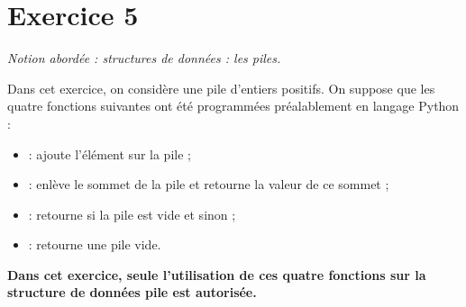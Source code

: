 \documentclass[11pt,a4paper,french,twoside]{PMCours}
\begin{document}
\newpage
\section*{Exercice 5}
\emph{Notion abordée : structures de données : les piles.}

\medskip
Dans cet exercice, on considère une pile d'entiers positifs. On suppose que les quatre
fonctions suivantes ont été programmées préalablement en langage Python :
\begin{itemize}
\item[]  : ajoute l'élément  sur la pile  ;
\item[]  : enlève le sommet de la pile  et retourne la valeur de ce sommet ;
\item[]  : retourne  si la pile est vide et  sinon ;
\item[]  : retourne une pile vide.
\end{itemize} 

\textbf{Dans cet exercice, seule l'utilisation de ces quatre fonctions sur la structure de
données pile est autorisée.}
\end{document}
